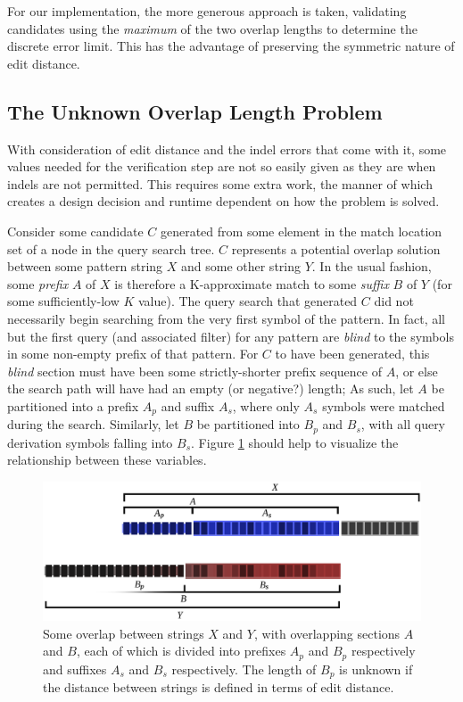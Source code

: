 For our implementation, the more generous approach is taken, validating \glspl{candidate} using the \textit{maximum} of the two overlap lengths to determine the discrete error limit. This has the advantage of preserving the symmetric nature of edit distance.



\subsection{The Unknown Overlap Length Problem}
\label{unknown_b}

With consideration of \gls{edit distance} and the \gls{indel} \glspl{error} that come with it, some values needed for the \gls{verification step} are not so easily given as they are when indels are not permitted. This requires some extra work, the manner of which creates a design decision and runtime dependent on how the problem is solved.

Consider some candidate $C$ generated from some element in the \gls{match location} set of a node in the \gls{query} search tree. $C$ represents a potential overlap \gls{solution} between some \gls{pattern} string $X$ and some other string $Y$. In the usual \aspop{} fashion, some \textit{prefix} $A$ of $X$ is therefore a \gls{K-approximate} match to some \textit{suffix} $B$ of $Y$ (for some sufficiently-low $K$ value). The query search that generated $C$ did not necessarily begin searching from the very first symbol of the pattern. In fact, all but the first query (and associated \gls{filter}) for any pattern are \textit{blind} to the symbols in some non-empty prefix of that pattern. For $C$ to have been generated, this \textit{blind} section must have been some strictly-shorter prefix sequence of $A$, or else the search path will have had an empty (or negative?) length; As such, let $A$ be partitioned into a prefix $A_p$ and suffix $A_s$, where only $A_s$ symbols were matched during the search. Similarly, let $B$ be partitioned into $B_p$ and $B_s$, with all query \gls{derivation} symbols falling into $B_s$. Figure \ref{fig:blind} should help to visualize the relationship between these variables.

\begin{figure}[!htb]
\centering
\includegraphics[width=.8\textwidth]{images/blind.png}
\caption[Overlaps between two strings $X$ and $Y$, illustrating the portion of the overlap with an unknown length.]{Some overlap between strings $X$ and $Y$, with overlapping sections $A$ and $B$, each of which is divided into prefixes $A_p$ and $B_p$ respectively and suffixes $A_s$ and $B_s$ respectively. The length of $B_p$ is unknown if the distance between strings is defined in terms of edit distance.}
\label{fig:blind}
\end{figure}

